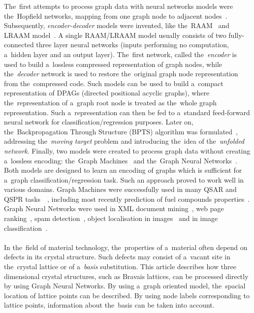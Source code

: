 \documentclass{llncs}
\begin{document}
The~first attempts to process graph data with neural networks models were the~Hopfield networks, mapping from one graph node to adjacent nodes~\cite{goulon2005hopfield}. Subsequently, \emph{encoder-decoder} models were invented, like the~RAAM~\cite{pollack1990recursive} and LRAAM model~\cite{sperduti1994labelling}. A single RAAM/LRAAM model usually consists of two fully-connected three layer neural networks (inputs performing no computation, a~hidden layer and an output layer). The~first network, called the~\emph{encoder} is used to build a~lossless compressed representation of graph nodes, while the~\emph{decoder} network is used to restore the~original graph node representation from the~compressed code. Such models can be used to build a~compact representation of DPAGs (directed positional acyclic graphs), where the~representation of a~graph root node is treated as the~whole graph representation. Such a~representation can then be fed to a~standard feed-forward neural network for classification/regression purposes. Later on, the~Backpropagation Through Structure (BPTS) algorithm was formulated~\cite{goller1996learning}, addressing the~\emph{moving target} problem and introducing the~idea of the~\emph{unfolded network}. Finally, two models were created to process graph data without creating a~lossless encoding: the~Graph Machines~\cite{goulon2005learning} and the~Graph Neural Networks~\cite{scarselli2009graph}. Both models are designed to learn an encoding of graphs which is sufficient for a~graph classification/regression task. Such an approach proved to work well in various domains. Graph Machines were successfully used in many QSAR and QSPR tasks~\cite{goulon2007predicting}~\cite{goulon2011novel}, including most recently prediction of fuel compounds properties~\cite{saldana2013rational}. Graph Neural Networks were used in XML document mining~\cite{yong2006xml}, web page ranking~\cite{scarselli2005graph}, spam detection~\cite{scarselli2013solving}, object localisation in images~\cite{monfardini2006graph} and in image classification~\cite{quek2011structural}.
\\\\
In the~field of material technology, the~properties of a~material often depend on defects in its crystal structure. Such defects may consist of a~vacant site in the~crystal lattice or of a~\emph{basis} substitution.
This article describes how three dimensional crystal structures, such as Bravais lattices, can be processed directly by using Graph Neural Networks. By using a~graph oriented model, the~spacial location of lattice points can be described. By using node labels corresponding to lattice points, information about the~basis can be taken into account.
\end{document}
